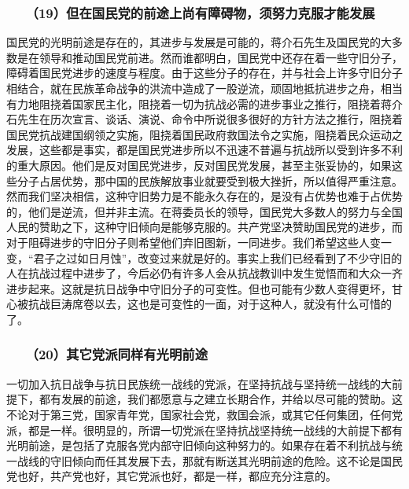 \documentclass[cn,11pt,chinese]{elegantbook}
\def\myformat#1{\hfil\hfil #1}
\begin{document}
\subsubsection*{\myformat{　　（19）但在国民党的前途上尚有障碍物，须努力克服才能发展}}
国民党的光明前途是存在的，其进步与发展是可能的，蒋介石先生及国民党的大多数是在领导和推动国民党前进。然而谁都明白，国民党中还存在着一些守旧分子，障碍着国民党进步的速度与程度。由于这些分子的存在，并与社会上许多守旧分子相结合，就在民族革命战争的洪流中造成了一股逆流，顽固地抵抗进步之舟，相当有力地阻挠着国家民主化，阻挠着一切为抗战必需的进步事业之推行，阻挠着蒋介石先生在历次宣言、谈话、演说、命令中所说很多很好的方针方法之推行，阻挠着国民党抗战建国纲领之实施，阻挠着国民政府救国法令之实施，阻挠着民众运动之发展，这些都是事实，都是国民党进步所以不迅速不普遍与抗战所以受到许多不利的重大原因。他们是反对国民党进步，反对国民党发展，甚至主张妥协的，如果这些分子占居优势，那中国的民族解放事业就要受到极大挫折，所以值得严重注意。然而我们坚决相信，这种守旧势力是不能永久存在的，是没有占优势也难于占优势的，他们是逆流，但并非主流。在蒋委员长的领导，国民党大多数人的努力与全国人民的赞助之下，这种守旧倾向是能够克服的。共产党坚决赞助国民党的进步，而对于阻碍进步的守旧分子则希望他们弃旧图新，一同进步。我们希望这些人变一变，“君子之过如日月蚀”，改变过来就是好的。事实上我们已经看到了不少守旧的人在抗战过程中进步了，今后必仍有许多人会从抗战教训中发生觉悟而和大众一齐进步起来。这就是抗日战争中守旧分子的可变性。但也可能有少数人变得更坏，甘心被抗战巨涛席卷以去，这也是可变性的一面，对于这种人，就没有什么可惜的了。\\
\subsubsection*{\myformat{　　（20）其它党派同样有光明前途}}
一切加入抗日战争与抗日民族统一战线的党派，在坚持抗战与坚持统一战线的大前提下，都有发展的前途，我们都愿意与之建立长期合作，并给以尽可能的赞助。这不论对于第三党，国家青年党，国家社会党，救国会派，或其它任何集团，任何党派，都是一样。很明显的，所谓一切党派在坚持抗战坚持统一战线的大前提下都有光明前途，是包括了克服各党内部守旧倾向这种努力的。如果存在着不利抗战与统一战线的守旧倾向而任其发展下去，那就有断送其光明前途的危险。这不论是国民党也好，共产党也好，其它党派也好，都是一样，都应充分注意的。\\
\end{document}
